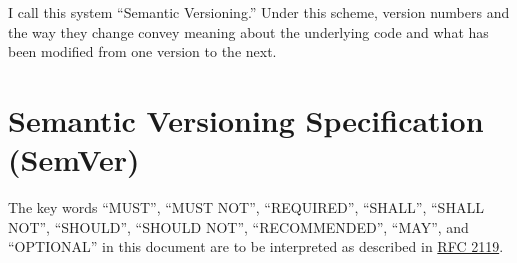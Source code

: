 \documentclass[a4paper,12pt,notitlepage,twoside,openright]{article}
\begin{document}
I call this system ``Semantic Versioning.'' Under this scheme, version
numbers and the way they change convey meaning about the underlying code
and what has been modified from one version to the next.

\hypertarget{semantic-versioning-specification-semver}{%
\section{Semantic Versioning Specification
(SemVer)}\label{semantic-versioning-specification-semver}}

The key words ``MUST'', ``MUST NOT'', ``REQUIRED'', ``SHALL'', ``SHALL
NOT'', ``SHOULD'', ``SHOULD NOT'', ``RECOMMENDED'', ``MAY'', and
``OPTIONAL'' in this document are to be interpreted as described in
\href{http://tools.ietf.org/html/rfc2119}{RFC 2119}.
\end{document}

